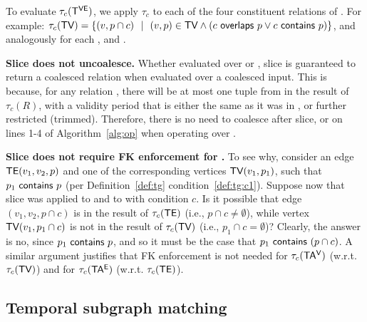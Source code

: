 To evaluate $\tau_c (\mathsf{T^{VE}})$, we apply $\tau_c$ to each of the four
constituent relations of \tve.  For example: 
$\tau_c (\textsf{TV}) = \{ (v, p
\cap c)~~|~~(v, p) \in \textsf{TV} \wedge (c~\mathsf{overlaps}~p \vee c~\mathsf{contains}~p) \}$, 
and analogously for each \te, \tav and \tae.



{\bf Slice does not uncoalesce.} Whether evaluated over \trg or \tve,
slice is guaranteed to return a coalesced relation when evaluated over
a coalesced input.  This is because, for any relation , there
will be at most one tuple from  in the result of $\tau_c (R)$,
with a validity period that is either the same as it was in ,
or further restricted (trimmed).  Therefore, there is no need to
coalesce \trg after slice, or on lines 1-4 of Algorithm~\ref{alg:op}
when operating over \tve.

{\bf Slice does not require FK enforcement for \tve.}  To see why,
consider an edge $\textsf{TE}(v_1, v_2, p)$ and one of the corresponding
vertices $\textsf{TV}(v_1, p_1)$, such that $p_1~\mathsf{contains}~p$ (per
Definition~\ref{def:tg} condition~\ref{def:tg:c1}).  Suppose now that
slice was applied to \tv and to \te with condition $c$.  Is it
possible that edge $(v_1, v_2, p \cap c)$ is in the result of $\tau_c
(\textsf{TE})$ (i.e., $p \cap c \neq \emptyset$), while vertex $\textsf{TV}(v_1, p_1 \cap
c)$ is not in the result of $\tau_c (\textsf{TV})$ (i.e., $p_1 \cap c =
\emptyset$)?  Clearly, the answer is no, since
$p_1~\mathsf{contains}~p$, and so it must be the case that
$p_1~\mathsf{contains}~(p \cap c)$.  A similar argument justifies that
FK enforcement is not needed for $\tau_c(\mathsf{TA^{V}})$ (w.r.t. $\tau_c (\textsf{TV})$) and
for $\tau_c(\mathsf{TA^{E}})$ (w.r.t. $\tau_c (\textsf{TE})$).

\subsection{Temporal subgraph matching}
\label{sec:algebra:subgraph}


